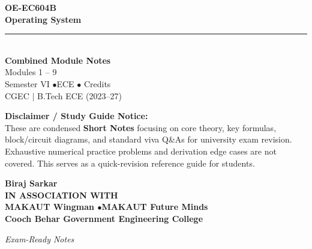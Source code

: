 \documentclass[12pt,a4paper]{article}
\begin{document}
\thispagestyle{empty}


\vspace*{1.0cm}
\begin{center}
  {\Huge\bfseries\color{myred} OE-EC604B}\\[10pt]
  {\LARGE\bfseries\color{mydark} Operating System}\\[20pt]
  {\color{myred}\rule{0.7\linewidth}{1.5pt}}\\[18pt]
  {\Large\color{myteal}\textbf{Combined Module Notes}}\\[8pt]
  {\large\color{mydark} Modules 1 -- 9}\\[40pt]
  {\normalsize\color{mydark} Semester VI \quad$\bullet$\quad ECE \quad$\bullet$ Credits}\\[12pt]
  {\normalsize\color{mydark} CGEC \;$|$\; B.Tech ECE (2023--27)}
\end{center}
\vspace{1.0cm}
\begin{center}
  \begin{tcolorbox}[colback=mygray, colframe=mgframe, boxrule=0.5pt, arc=3pt, width=0.85\linewidth]
    \centering\small\color{mydark}
    \textbf{Disclaimer / Study Guide Notice:}\\
    These are condensed \textbf{Short Notes} focusing on core theory, key formulas, block/circuit diagrams, and standard viva Q\&As for university exam revision. Exhaustive numerical practice problems and derivation edge cases are not covered. This serves as a quick-revision reference guide for students.
  \end{tcolorbox}
\end{center}
\vfill
\vspace{0.6cm}
\begin{center}
  {\large\bfseries\color{mypurple} Biraj Sarkar}\\[16pt]
  {\footnotesize\color{watermark}\textbf{IN ASSOCIATION WITH}}\\[8pt]
  {\small\bfseries\color{mydark} MAKAUT Wingman \quad$\bullet$\quad MAKAUT Future Minds}\\[12pt]
  {\large\bfseries\color{myteal} Cooch Behar Government Engineering College}
\end{center}
\vfill
\begin{center}{\small\color{watermark}\textit{Exam-Ready Notes}}\end{center}
\clearpage
\end{document}
